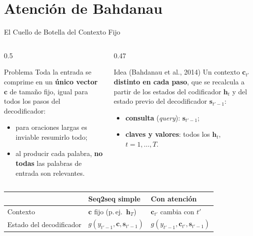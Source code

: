 \documentclass[aspectratio=169, 10pt]{beamer}
\begin{document}
\section{Atenci\'on de Bahdanau}

\begin{frame}{El Cuello de Botella del Contexto Fijo}

	\begin{columns}[T]
		\begin{column}{0.5\textwidth}
			\begin{alertblock}{Problema}
				\small
				Toda la entrada se comprime en un \textbf{\'unico vector} $\mathbf{c}$ de tama\~no fijo, igual para todos los pasos del decodificador:
				\begin{itemize}
					\item para oraciones largas es inviable resumirlo todo;
					\item al producir cada palabra, \textbf{no todas} las palabras de entrada son relevantes.
				\end{itemize}
			\end{alertblock}
		\end{column}

		\begin{column}{0.47\textwidth}
			\begin{block}{Idea (Bahdanau et al., 2014)}
				\small
				Un contexto $\mathbf{c}_{t'}$ \textbf{distinto en cada paso}, que se recalcula a partir de los estados del codificador $\mathbf{h}_t$ y del estado previo del decodificador $\mathbf{s}_{t'-1}$:
				\begin{itemize}
					\item \textbf{consulta} (\emph{query}): $\mathbf{s}_{t'-1}$;
					\item \textbf{claves y valores}: todos los $\mathbf{h}_t$, $t=1,\ldots,T$.
				\end{itemize}
			\end{block}
		\end{column}
	\end{columns}

	\vspace{0.2cm}
	\centering
	\begin{tabular}{@{}lll@{}}
		\toprule
		& Seq2seq simple & Con atenci\'on \\
		\midrule
		Contexto & $\mathbf{c}$ fijo (p.\,ej.\ $\mathbf{h}_T$) & $\mathbf{c}_{t'}$ cambia con $t'$ \\
		Estado del decodificador & $g(y_{t'-1},\mathbf{c},\mathbf{s}_{t'-1})$ & $g(y_{t'-1},\mathbf{c}_{t'},\mathbf{s}_{t'-1})$ \\
		\bottomrule
	\end{tabular}

\end{frame}
\end{document}
